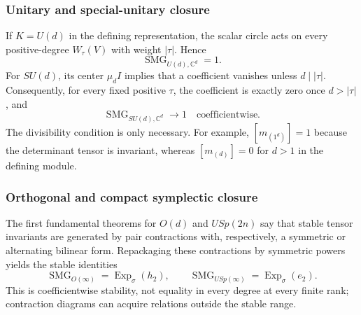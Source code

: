 \documentclass[10pt]{article}
\newcommand{\ExpS}{\operatorname{Exp}_{\sigma}}
\newcommand{\SMG}{\operatorname{SMG}}
\newcommand{\MGF}{\SMG}
\newcommand{\C}{\mathbb C}
\begin{document}
\subsubsection{Unitary and special-unitary closure}

If $K=U(d)$ in the defining representation, the scalar circle acts on every
positive-degree $W_\tau(V)$ with weight $|\tau|$.  Hence
\begin{equation}\label{nd:braid_tqft:eq:u-trivial}
\boxed{\MGF_{U(d),\C^d}=1.}
\end{equation}
For $SU(d)$, its center $\mu_dI$ implies that a coefficient vanishes unless
$d\mid|\tau|$.  Consequently, for every fixed positive $\tau$, the
coefficient is exactly zero once $d>|\tau|$, and
\begin{equation}\label{nd:braid_tqft:eq:su-limit}
\MGF_{SU(d),\C^d}\longrightarrow1
\quad\text{coefficientwise.}
\end{equation}
The divisibility condition is only necessary.  For example,
$[m_{(1^d)}]=1$ because the determinant tensor is invariant, whereas
$[m_{(d)}]=0$ for $d>1$ in the defining module.

\subsubsection{Orthogonal and compact symplectic closure}

The first fundamental theorems for $O(d)$ and $USp(2n)$ say that stable tensor
invariants are generated by pair contractions with, respectively, a
symmetric or alternating bilinear form.  Repackaging these contractions by
symmetric powers yields the stable identities
\begin{equation}\label{nd:braid_tqft:eq:stable-classical}
\boxed{
\MGF_{O(\infty)}=\ExpS(h_2),\qquad
\MGF_{USp(\infty)}=\ExpS(e_2).}
\end{equation}
This is coefficientwise stability, not equality in every degree at every
finite rank; contraction diagrams can acquire relations outside the stable
range.
\end{document}
